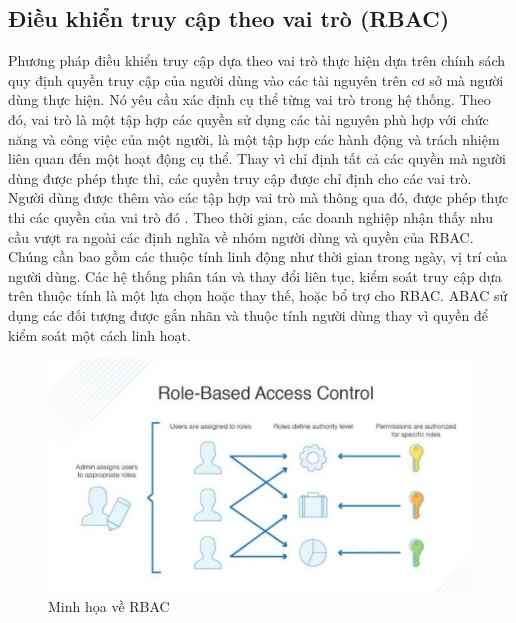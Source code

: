 \subsection{Điều khiển truy cập theo vai trò (RBAC)}
Phương pháp điều khiển truy cập dựa theo vai trò thực hiện dựa trên chính sách
quy định quyền truy cập của người dùng vào các tài nguyên trên cơ sở mà người dùng
thực hiện. Nó yêu cầu xác định cụ thể từng vai trò trong hệ thống. Theo đó, vai trò là
một tập hợp các quyền sử dụng các tài nguyên phù hợp với chức năng và công việc của
một người, là một tập hợp các hành động và trách nhiệm liên quan đến một hoạt động
cụ thể. Thay vì chỉ định tất cả các quyền mà người dùng được phép thực thi, các quyền
truy cập được chỉ định cho các vai trò. Người dùng được thêm vào các tập hợp vai trò
mà thông qua đó, được phép thực thi các quyền của vai trò đó \cite{hu2006assessment}. 
\indent Theo thời gian, các doanh nghiệp nhận thấy nhu cầu vượt ra ngoài các định nghĩa
về nhóm người dùng và quyền của RBAC. Chúng cần bao gồm các thuộc tính linh động
như thời gian trong ngày, vị trí của người dùng. Các hệ thống phân tán và thay đổi liên
tục, kiểm soát truy cập dựa trên thuộc tính là một lựa chọn hoặc thay thế, hoặc bổ trợ
cho RBAC. ABAC sử dụng các đối tượng được gắn nhãn và thuộc tính người dùng thay
vì quyền để kiểm soát một cách linh hoạt.
\begin{figure}
    \centering
    \includegraphics[scale=0.7]{graphics/chapter-2/chap2-rbac.png}
    \caption{Minh họa về RBAC}
    \label{fig:enter-label}
\end{figure}
